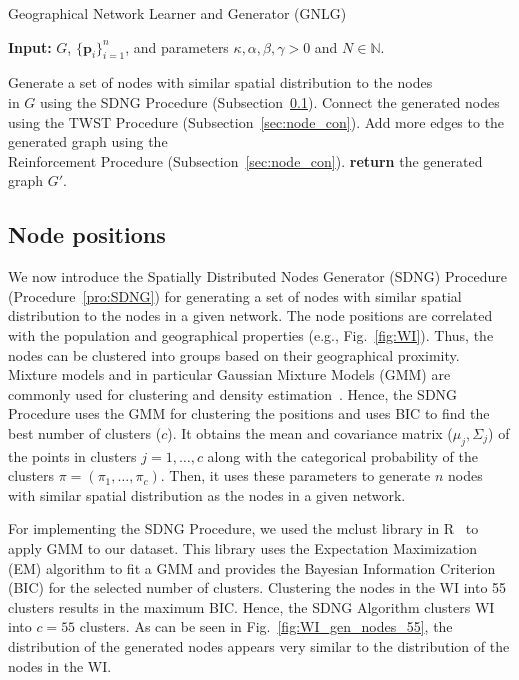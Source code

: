 \documentclass[10pt,journal]{IEEEtran}
\begin{document}
\begin{algorithm}[t]
\footnotesize
\caption{Geographical Network Learner and Generator (GNLG)}
\begin{trivlist}
\item\textbf{Input:} $G$, $\{\textbf{p}_i\}_{i=1}^n$, and parameters $\kappa,\alpha,\beta,\gamma>0$ and $N\in \mathbb{N}$.
\end{trivlist}
\vspace*{-3mm}
\begin{algorithmic}[1]
\STATE Generate a set of nodes with similar spatial distribution to the nodes \\in $G$ using the SDNG Procedure (Subsection~\ref{sec:node_pos}).
\STATE Connect the generated nodes using the TWST Procedure (Subsection~\ref{sec:node_con}).
\STATE Add more edges to the generated graph using the \\Reinforcement Procedure (Subsection~\ref{sec:node_con}).
\STATE \textbf{return} the generated graph $G'$.
\end{algorithmic}
\label{alg:GSN}
\end{algorithm}

\subsection{Node positions}\label{sec:node_pos}

We now introduce the Spatially Distributed Nodes Generator (SDNG) Procedure (Procedure~\ref{pro:SDNG}) for  generating a set of nodes with similar spatial distribution to the nodes in a given network. The node positions are correlated with the population and geographical properties (e.g.,  Fig.~\ref{fig:WI}). Thus, the nodes can be clustered into groups based on their geographical proximity. Mixture models and in particular Gaussian Mixture Models (GMM) are commonly used for clustering and density estimation~\cite{fraley2002model}. Hence, the SDNG Procedure uses the GMM for clustering the positions and uses BIC to find the best number of clusters ($c$). It obtains the mean and covariance matrix ($\mu_j, \Sigma_j$) of the points in clusters $j=1,\dots, c$  along with the categorical probability of the clusters $\pi=(\pi_1,\dots,\pi_{c})$. Then, it uses these parameters to generate $n$ nodes with similar spatial distribution as the nodes in a given network.

For implementing the SDNG Procedure, we used the {\ttfamily mclust} library in {\ttfamily R}~\cite{fraley2012mclust} to apply GMM to our dataset. This library uses the Expectation Maximization (EM) algorithm to fit a GMM and provides the Bayesian Information Criterion (BIC) for the selected number of clusters.
Clustering the nodes in the WI into 55 clusters results in the maximum BIC. Hence, the SDNG Algorithm clusters WI into $c=55$ clusters. As can be seen in Fig.~\ref{fig:WI_gen_nodes_55}, the distribution of the generated nodes appears very similar to the distribution of the nodes in the WI.
\end{document}
